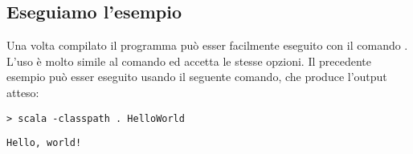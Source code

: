 \subsection{Eseguiamo l'esempio}
\label{sec:running-example}

Una volta compilato il programma pu\`o esser facilmente eseguito con il comando \scala. L'uso \`e molto simile al comando \java ed accetta le stesse opzioni. Il precedente esempio pu\`o esser eseguito usando il seguente comando, che produce l'output atteso:
\begin{verbatim}
> scala -classpath . HelloWorld
\end{verbatim}
\begin{verbatim}
Hello, world!
\end{verbatim}